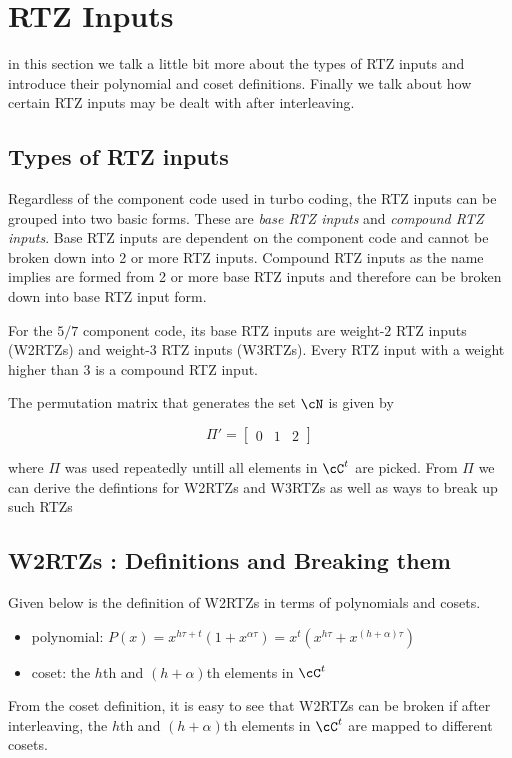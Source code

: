 \section{RTZ Inputs}
in this section we talk a little bit more about the types of  RTZ inputs and introduce their polynomial and coset definitions. Finally we talk about how certain RTZ inputs may be dealt with after interleaving.

\subsection{Types of RTZ inputs}
Regardless of the component code used in turbo coding, the RTZ inputs can be grouped into two basic forms. These are \textit{base RTZ inputs} and \textit{compound RTZ inputs}. Base RTZ inputs are dependent on the component code and cannot be broken down into 2 or more RTZ inputs. Compound RTZ inputs as the name implies are formed from 2 or more base RTZ inputs and therefore can be broken down into base RTZ input form.

For the $5/7$ component code, its base RTZ inputs are weight-$2$ RTZ inputs  (W2RTZs) and weight-$3$ RTZ inputs (W3RTZs). Every RTZ input with a weight higher than 3 is a compound RTZ input.

The permutation matrix that generates the set $\cN$ is given by 

$$\Pi'=\begin{bmatrix} 0 & 1 & 2 \end{bmatrix}$$ 

where $\Pi$ was used repeatedly untill all elements in $\cC^t$ are picked. From $\Pi$ we can derive the defintions for W2RTZs and W3RTZs as well as ways to break up such RTZs

\subsection{W2RTZs : Definitions and Breaking them}
Given below is the definition of W2RTZs in terms of polynomials and cosets.
\begin{itemize}
	\item polynomial: $P(x)=x^{h\tau+t}(1+x^{\alpha \tau}) = x^t(x^{h\tau}+x^{(h+\alpha)\tau})$
	\item coset: the $h$th and $(h+\alpha)$th elements in $\cC^t$
\end{itemize}

From the coset definition, it is easy to see that W2RTZs can be broken if after interleaving,  the $h$th and $(h+\alpha)$th elements in $\cC^t$ are mapped to different cosets.

